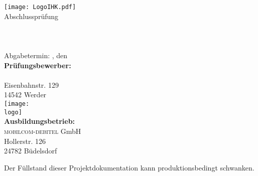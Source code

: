 \thispagestyle{plain}
\begin{titlepage}

\begin{center}
\texttt{[image: LogoIHK.pdf]}\\[1ex]
\Large{Abschlussprüfung \pruefungstermin}\\[3ex]

\Large{\ausbildungsberuf}\\
\LARGE{\betreff}\\[4ex]

\huge{\textbf{\titel}}\\[1.5ex]

\normalsize
Abgabetermin: \ort, den \abgabetermin\\[3em]
\textbf{Prüfungsbewerber:}\\
\autor\\
Eisenbahnstr. 129\\
14542 Werder\\[5ex]

\texttt{[image: \\logo]}\\[2ex]
\textbf{Ausbildungsbetrieb:}\\
\textsc{mobilcom-debitel} GmbH\\
Hollerstr. 126\\
24782 Büdelsdorf\\[5em]
\end{center}

\small
\noindent
Der Füllstand dieser Projektdokumentation kann produktionsbedingt schwanken.
\end{titlepage}